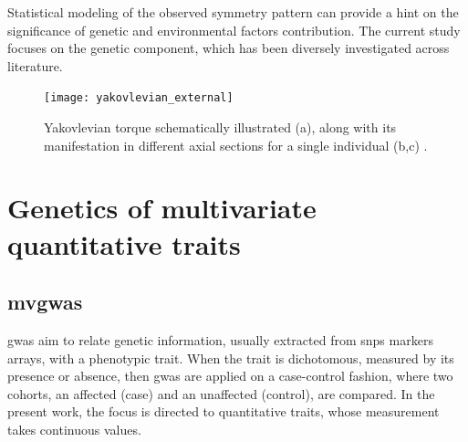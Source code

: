 Statistical modeling of the observed symmetry pattern can provide a hint on the significance  of genetic and environmental factors contribution\cite{Klingenberg2020}. The current study focuses on the genetic component, which has been diversely investigated across literature.


\begin{figure}
	\centering
%		
\centering
\texttt{[image: yakovlevian\_external]}
\caption[Yakovlevian Torque \cite{Kuo2022}]{Yakovlevian torque schematically illustrated (a), along with its manifestation in different axial sections for a single individual (b,c) \cite{Kuo2022}.}
\label{fig:yaktorque}
\end{figure}



\section{Genetics of multivariate quantitative traits}

\subsection{\Acf{mvgwas}}
\Ac{gwas} aim to relate genetic information, usually extracted from \acfp{snp} markers arrays, with a phenotypic trait. When the trait is dichotomous, measured by its presence or absence, then \ac{gwas} are applied on a case-control fashion, where two cohorts, an affected (case) and an unaffected (control), are compared. \cite{Uffelmann2021} In the present work, the focus is directed to quantitative traits, whose measurement takes continuous values. 


